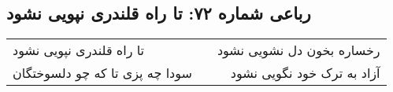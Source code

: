 \begin{center}
\section*{رباعی شماره ۷۲: تا راه قلندری نپویی نشود}
\label{sec:sh072}
\begin{longtable}{l p{0.5cm} r}
تا راه قلندری نپویی نشود
&&
رخساره بخون دل نشویی نشود
\\
سودا چه پزی تا که چو دلسوختگان
&&
آزاد به ترک خود نگویی نشود
\\
\end{longtable}
\end{center}
